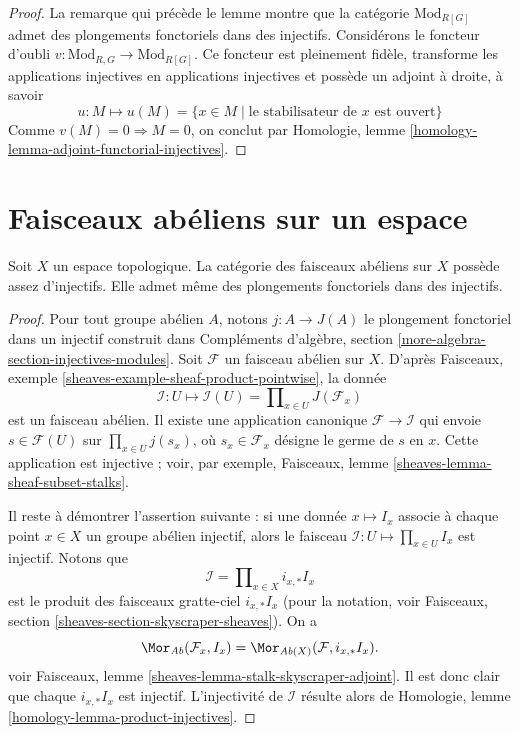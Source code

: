 \begin{proof}
La remarque qui précède le lemme montre que la catégorie
$\text{Mod}_{R[G]}$ admet des plongements fonctoriels dans des injectifs. Considérons le
foncteur d'oubli
$v : \text{Mod}_{R, G} \to \text{Mod}_{R[G]}$.
Ce foncteur est pleinement fidèle, transforme les applications injectives en
applications injectives et possède un adjoint à droite, à savoir
$$
u : M \mapsto u(M) = \{x \in M \mid \text{le stabilisateur de }x\text{ est ouvert}\}
$$
Comme $v(M) = 0 \Rightarrow M = 0$, on conclut par
Homologie, lemme \ref{homology-lemma-adjoint-functorial-injectives}.
\end{proof}



\section{Faisceaux abéliens sur un espace}
\label{section-abelian-sheaves-space}


\begin{lemma}
\label{lemma-abelian-sheaves-space}
Soit $X$ un espace topologique. La catégorie des faisceaux abéliens sur $X$
possède assez d'injectifs. Elle admet même des plongements fonctoriels dans des
injectifs.
\end{lemma}

\begin{proof}
Pour tout groupe abélien $A$, notons $j : A \to J(A)$ le plongement fonctoriel
dans un injectif construit dans
Compléments d'algèbre, section
\ref{more-algebra-section-injectives-modules}.
Soit $\mathcal{F}$ un faisceau abélien sur $X$. D'après Faisceaux, exemple
\ref{sheaves-example-sheaf-product-pointwise}, la donnée
$$
\mathcal{I} : U \mapsto
\mathcal{I}(U) = \prod\nolimits_{x\in U} J(\mathcal{F}_x)
$$
est un faisceau abélien. Il existe une application canonique
$\mathcal{F} \to \mathcal{I}$ qui envoie $s \in \mathcal{F}(U)$ sur
$\prod_{x \in U} j(s_x)$, où $s_x \in \mathcal{F}_x$ désigne le germe de $s$
en $x$. Cette application est injective ; voir, par exemple, Faisceaux, lemme
\ref{sheaves-lemma-sheaf-subset-stalks}.

\medskip\noindent
Il reste à démontrer l'assertion suivante : si une donnée $x \mapsto I_x$
associe à chaque point $x \in X$ un groupe abélien injectif, alors le faisceau
$\mathcal{I} : U \mapsto \prod_{x \in U} I_x$ est injectif. Notons que
$$
\mathcal{I} = \prod\nolimits_{x \in X} i_{x, *}I_x
$$
est le produit des faisceaux gratte-ciel $i_{x, *}I_x$ (pour la notation, voir
Faisceaux, section \ref{sheaves-section-skyscraper-sheaves}). On a
$$
\Mor_{\textit{Ab}}(\mathcal{F}_x, I_x)
=
\Mor_{\textit{Ab}(X)}(\mathcal{F}, i_{x, *}I_x).
$$
voir Faisceaux, lemme \ref{sheaves-lemma-stalk-skyscraper-adjoint}. Il est donc
clair que chaque $i_{x, *}I_x$ est injectif. L'injectivité de $\mathcal{I}$
résulte alors de
Homologie, lemme \ref{homology-lemma-product-injectives}.
\end{proof}










